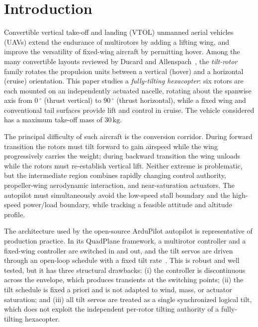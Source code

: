 \documentclass[preprint,3p,11pt]{elsarticle}
\newcommand{\SI}[2]{\ensuremath{#1\,#2}}
\newcommand{\kilogram}{\mathrm{kg}}
\newcommand{\degree}{^{\circ}}
\begin{document}
\section{Introduction}\label{sec:intro}

Convertible vertical take-off and landing (VTOL) unmanned aerial vehicles
(UAVs) extend the endurance of multirotors by adding a lifting wing, and
improve the versatility of fixed-wing aircraft by permitting hover. Among the
many convertible layouts reviewed by Ducard and Allenspach~\cite{ducard2021review},
the \emph{tilt-rotor} family rotates the propulsion units between a vertical
(hover) and a horizontal (cruise) orientation. This paper studies a
\emph{fully-tilting hexacopter}: six rotors are each mounted on an
independently actuated nacelle, rotating about the spanwise axis from
\SI{0}{\degree} (thrust vertical) to \SI{90}{\degree} (thrust horizontal),
while a fixed wing and conventional tail surfaces provide lift and control in
cruise. The vehicle considered has a maximum take-off mass of
\SI{30}{\kilogram}.

The principal difficulty of such aircraft is the conversion corridor. During
forward transition the rotors must tilt forward to gain airspeed while the wing
progressively carries the weight; during backward transition the wing unloads
while the rotors must re-establish vertical lift. Neither extreme is
problematic, but the intermediate region combines rapidly changing control
authority, propeller-wing aerodynamic interaction, and near-saturation
actuators. The autopilot must simultaneously avoid the low-speed stall
boundary and the high-speed power/load boundary, while tracking a feasible
attitude and altitude profile.

The architecture used by the open-source ArduPilot autopilot is
representative of production practice. In its QuadPlane framework, a
multirotor controller and a fixed-wing controller are switched in and out, and
the tilt servos are driven through an open-loop schedule with a fixed tilt
rate~\cite{ardupilot2024tilt,ardupilot2024transitions}. This is robust and
well tested, but it has three structural drawbacks: (i) the controller is
discontinuous across the envelope, which produces transients at the switching
points; (ii) the tilt schedule is fixed a priori and is not adapted to wind,
mass, or actuator saturation; and (iii) all tilt servos are treated as a
single synchronized logical tilt, which does not exploit the independent
per-rotor tilting authority of a fully-tilting hexacopter.
\end{document}
